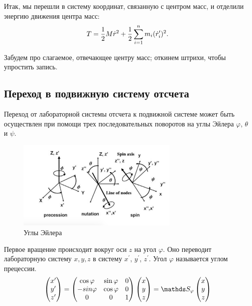 Итак, мы перешли в систему координат, связанную с центром масс, и отделили энергию движения центра масс:
\vspace*{-0.1cm}
\begin{gather}
T = \frac{1}{2} M \dot{r}^2 + \frac{1}{2} \sum_{i=1}^{n} m_i( \dot{r}_i^\prime)^2. \notag
\end{gather}

Забудем про слагаемое, отвечающее центру масс; откинем штрихи, чтобы упростить запись.

\subsection{Переход в подвижную систему отсчета}

Переход от лабораторной системы отсчета к подвижной системе может быть осуществлен при помощи трех последовательных поворотов на углы Эйлера $\varphi$, $\theta$ и $\psi$. 

\begin{figure}
  \centering
	\includegraphics[width=0.7\textwidth]{../pictures/EulerAngles.jpg}
	\caption{Углы Эйлера}
	\label{fig:EulerAngles}
\end{figure}

Первое вращение происходит вокруг оси $z$ на угол $\varphi$. Оно переводит лабораторную систему $x, y, z$ в систему $x^\prime$, $y^\prime$, $z^\prime$. Угол $\varphi$ называется углом прецессии.
\begin{gather}
\begin{pmatrix}
x^\prime \\
y^\prime \\
z^\prime
\end{pmatrix} = 
\begin{pmatrix}
\cos \varphi & \sin \varphi & 0 \\
- sin \varphi & \cos \varphi & 0 \\
0 & 0 & 1
\end{pmatrix}
\begin{pmatrix}
x \\
y \\
z
\end{pmatrix} =
\bbS_\varphi
\begin{pmatrix}
x \\
y \\
z
\end{pmatrix} \notag
\end{gather}

